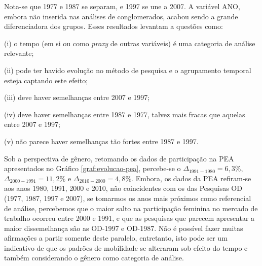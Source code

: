 \newpage
Nota-se que 1977 e 1987 se separam, e 1997 se une a 2007. 
A variável ANO, embora não inserida nas análises de conglomerados, acabou sendo a grande diferenciadora dos grupos.
Esses resultados levantam a questões como:
\begin{compactitem}[]
\item (i) o tempo (em si ou como \textit{proxy} de outras variáveis) é uma categoria de análise relevante;
\item (ii) pode ter havido evolução no método de pesquisa e o agrupamento temporal esteja captando este efeito; 
\item (iii) deve haver semelhanças entre 2007 e 1997;
\item (iv) deve haver semelhanças entre 1987 e 1977, talvez mais fracas que aquelas entre 2007 e 1997;
\item (v) não parece haver semelhanças tão fortes entre 1987 e 1997. %
\end{compactitem}
    
\begin{table}[htb]
\end{table}

Sob a perspectiva de gênero, retomando os dados de participação na PEA apresentados no Gráfico \ref{graf:evolucao-pea}, 
percebe-se o $\Delta_{1991-1980} = 6,3\%$, $\Delta_{2000-1991} = 11,2\%$ e $\Delta_{2010-2000} = 4,8\%$. Embora, os dados da PEA refiram-se aos anos 1980, 1991, 2000 e 2010, não coincidentes com os das Pesquisas OD (1977, 1987, 1997 e 2007), se tomarmos os anos mais próximos como referencial de análise, percebemos que o maior salto na participação feminina no mercado de trabalho ocorreu entre 2000 e 1991, e que as pesquisas que parecem apresentar a maior dissemelhança são as OD-1997 e OD-1987. Não é possível fazer muitas afirmações a partir somente deste paralelo, entretanto, isto pode ser um indicativo de que os padrões de mobilidade se alteraram sob efeito do tempo e também considerando o gênero como categoria de análise.
 
